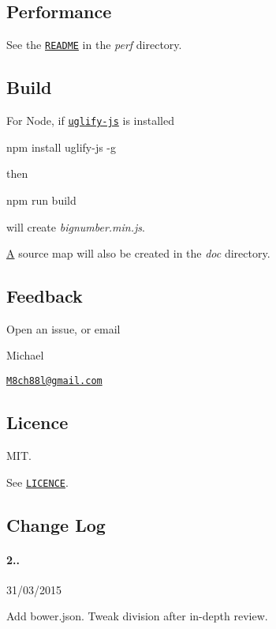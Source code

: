 \subsection*{Performance}

See the \href{https://github.com/MikeMcl/bignumber.js/tree/master/perf}{\tt R\+E\+A\+D\+M\+E} in the {\itshape perf} directory.

\subsection*{Build}

For Node, if \href{https://github.com/mishoo/UglifyJS2}{\tt uglify-\/js} is installed \begin{DoxyVerb}npm install uglify-js -g
\end{DoxyVerb}


then \begin{DoxyVerb}npm run build
\end{DoxyVerb}


will create {\itshape bignumber.\+min.\+js}.

\hyperlink{class_a}{A} source map will also be created in the {\itshape doc} directory.

\subsection*{Feedback}

Open an issue, or email

Michael

\href{mailto:M8ch88l@gmail.com}{\tt M8ch88l@gmail.\+com}

\subsection*{Licence}

M\+I\+T.

See \href{https://github.com/MikeMcl/bignumber.js/blob/master/LICENCE}{\tt L\+I\+C\+E\+N\+C\+E}.

\subsection*{Change Log}

\paragraph*{2..}


\begin{DoxyItemize}
\item 31/03/2015
\item Add bower.\+json. Tweak division after in-\/depth review.
\end{DoxyItemize}

